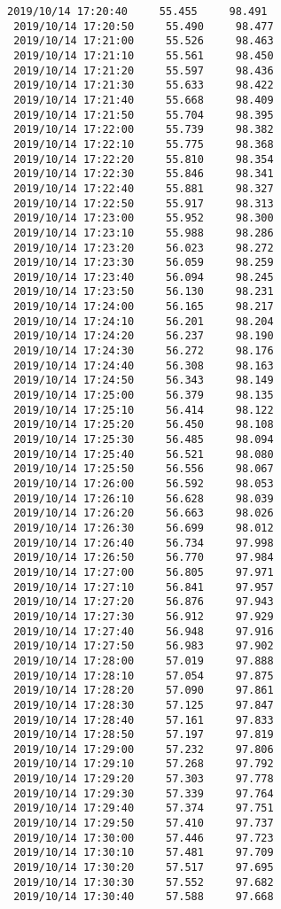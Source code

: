 \documentclass[11pt]{article}
\begin{document}
\begin{Verbatim}[commandchars=\\\{\}]
 2019/10/14 17:20:40     55.455     98.491
 2019/10/14 17:20:50     55.490     98.477
 2019/10/14 17:21:00     55.526     98.463
 2019/10/14 17:21:10     55.561     98.450
 2019/10/14 17:21:20     55.597     98.436
 2019/10/14 17:21:30     55.633     98.422
 2019/10/14 17:21:40     55.668     98.409
 2019/10/14 17:21:50     55.704     98.395
 2019/10/14 17:22:00     55.739     98.382
 2019/10/14 17:22:10     55.775     98.368
 2019/10/14 17:22:20     55.810     98.354
 2019/10/14 17:22:30     55.846     98.341
 2019/10/14 17:22:40     55.881     98.327
 2019/10/14 17:22:50     55.917     98.313
 2019/10/14 17:23:00     55.952     98.300
 2019/10/14 17:23:10     55.988     98.286
 2019/10/14 17:23:20     56.023     98.272
 2019/10/14 17:23:30     56.059     98.259
 2019/10/14 17:23:40     56.094     98.245
 2019/10/14 17:23:50     56.130     98.231
 2019/10/14 17:24:00     56.165     98.217
 2019/10/14 17:24:10     56.201     98.204
 2019/10/14 17:24:20     56.237     98.190
 2019/10/14 17:24:30     56.272     98.176
 2019/10/14 17:24:40     56.308     98.163
 2019/10/14 17:24:50     56.343     98.149
 2019/10/14 17:25:00     56.379     98.135
 2019/10/14 17:25:10     56.414     98.122
 2019/10/14 17:25:20     56.450     98.108
 2019/10/14 17:25:30     56.485     98.094
 2019/10/14 17:25:40     56.521     98.080
 2019/10/14 17:25:50     56.556     98.067
 2019/10/14 17:26:00     56.592     98.053
 2019/10/14 17:26:10     56.628     98.039
 2019/10/14 17:26:20     56.663     98.026
 2019/10/14 17:26:30     56.699     98.012
 2019/10/14 17:26:40     56.734     97.998
 2019/10/14 17:26:50     56.770     97.984
 2019/10/14 17:27:00     56.805     97.971
 2019/10/14 17:27:10     56.841     97.957
 2019/10/14 17:27:20     56.876     97.943
 2019/10/14 17:27:30     56.912     97.929
 2019/10/14 17:27:40     56.948     97.916
 2019/10/14 17:27:50     56.983     97.902
 2019/10/14 17:28:00     57.019     97.888
 2019/10/14 17:28:10     57.054     97.875
 2019/10/14 17:28:20     57.090     97.861
 2019/10/14 17:28:30     57.125     97.847
 2019/10/14 17:28:40     57.161     97.833
 2019/10/14 17:28:50     57.197     97.819
 2019/10/14 17:29:00     57.232     97.806
 2019/10/14 17:29:10     57.268     97.792
 2019/10/14 17:29:20     57.303     97.778
 2019/10/14 17:29:30     57.339     97.764
 2019/10/14 17:29:40     57.374     97.751
 2019/10/14 17:29:50     57.410     97.737
 2019/10/14 17:30:00     57.446     97.723
 2019/10/14 17:30:10     57.481     97.709
 2019/10/14 17:30:20     57.517     97.695
 2019/10/14 17:30:30     57.552     97.682
 2019/10/14 17:30:40     57.588     97.668

\end{Verbatim}
\end{document}
